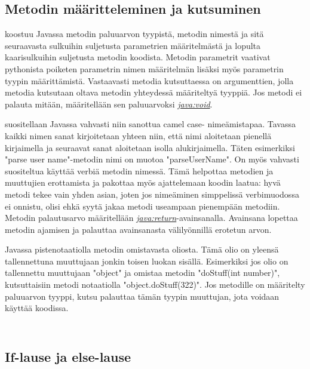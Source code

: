 \documentclass{tufte-book}
\newcommand{\java}[1]{\underline{\gls{java:#1}}}
\newcommand{\newjava}[1]{\textit{\java{#1}}}
\newcommand{\code}[3]{
\begin{listing}
    \inputminted{java}{OhjelmointiopasEsimerkit/src/#1/#2.java}
    \caption{#3}
    \label{Java-#1-#2}
\end{listing}
}
\begin{document}
\code{week2/basicexamples}{HelloWorld}{Yksinkertaisen pääluokan ja main-funktion luominen Javassa}

\subsection{Metodin määritteleminen ja kutsuminen}
\label{metodi}

 koostuu Javassa metodin paluuarvon tyypistä, metodin nimestä
ja sitä seuraavasta sulkuihin suljetusta parametrien määritelmästä ja lopulta kaarisulkuihin
suljetusta metodin koodista. Metodin parametrit vaativat pythonista poiketen parametrin nimen
määritelmän lisäksi myös parametrin tyypin määrittämistä. Vastaavasti metodia kutsuttaessa on
argumenttien, jolla metodia kutsutaan oltava metodin yhteydessä määriteltyä tyyppiä. Jos metodi
ei palauta mitään, määritellään sen paluuarvoksi \newjava{void}.

 suositellaan Javassa vahvasti niin sanottua camel case-
nimeämistapaa. Tavassa kaikki nimen sanat kirjoitetaan yhteen niin, että nimi aloitetaan
pienellä kirjaimella ja seuraavat sanat aloitetaan isolla alukirjaimella. Täten esimerkiksi
"parse user name"-metodin nimi on muotoa "parseUserName". On myös vahvasti suositeltua käyttää
verbiä metodin nimessä. Tämä helpottaa metodien ja muuttujien erottamista ja pakottaa
myös ajattelemaan koodin laatua: hyvä metodi tekee vain yhden asian, joten jos nimeäminen
simppelissä verbimuodossa ei onnistu, olisi ehkä syytä jakaa metodi useampaan pienempään
metodiin. Metodin palautusarvo määritellään \newjava{return}-avainsanalla. Avainsana lopettaa
metodin ajamisen ja palauttaa avainsanasta välilyönnillä erotetun arvon.

 Javassa pistenotaatiolla metodin omistavasta oliosta. Tämä
olio on yleensä tallennettuna muuttujaan jonkin toisen luokan sisällä. Esimerkiksi jos olio
on tallennettu muuttujaan "object" ja omistaa metodin "doStuff(int number)", kutsuttaisiin
metodi notaatiolla "object.doStuff(322)". Jos metodille on määritelty paluuarvon tyyppi, kutsu
palauttaa tämän tyypin muuttujan, jota voidaan käyttää koodissa.

\code{week2/methodexample}{MethodClass}{Metodin luominen Javassa}
\code{week2/methodexample}{MethodExample}{Metodin kutsuminen Javassa}

\subsection{If-lause ja else-lause}
\label{if else}
\end{document}
